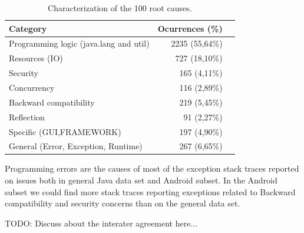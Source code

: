 \documentclass[conference]{IEEEtran}
\begin{document}
\begin{table}
  \centering
  \begin{tabular}{lrr}
    \hline
    \bfseries{Category} &  \bfseries{ Ocurrences (\%)} \\
    \hline
      Programming logic (java.lang and util) & 2235 (55,64\%)\\
      Resources (IO)                         &  727 (18,10\%) \\
      Security                               &  165 (4,11\%)\\
      Concurrency                            & 116  (2,89\%)\\
      Backward compatibility                 &  219 (5,45\%) \\
      Reflection                             &  91 (2,27\%)\\
      Specific (GUI,FRAMEWORK)               &  197 (4,90\%)\\
      General (Error, Exception, Runtime)    &  267 (6,65\%)\\
    \hline
  \end{tabular}
  \caption{Characterization of the 100 root causes.}
  \label{tab:tophundrend}
\end{table}

Programming errors are the causes of most of the exception stack traces reported
on issues both in  general Java data set and Android subset. In the Android subset we could find 
more stack traces reporting exceptions related to Backward
compatibility and security concerns than on the general data set.


TODO: Discuss about the interater agreement here...







\end{document}
